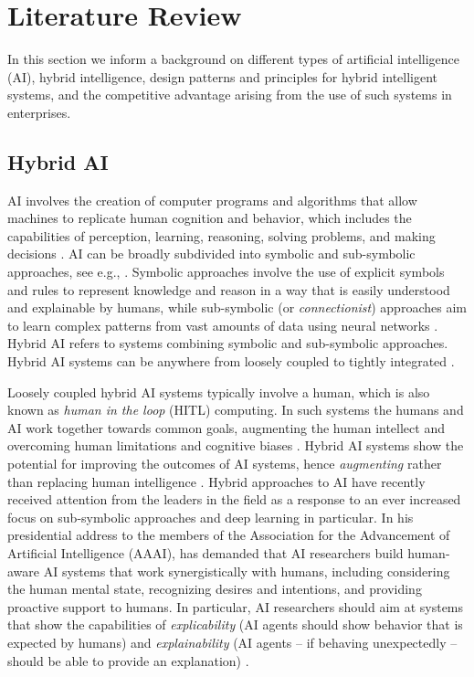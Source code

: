\section{Literature Review}
\label{sec:literature}

In this section we inform a background on different types of artificial intelligence (AI), hybrid intelligence, 
design patterns and principles for hybrid intelligent systems, and the competitive advantage arising from
the use of such systems in enterprises.

\subsection{Hybrid AI}

AI involves the creation of computer programs and algorithms that allow machines to replicate human cognition and behavior,
which includes the capabilities of perception, learning, reasoning, solving problems, and making decisions \citep{russel2010}.
AI can be broadly subdivided into symbolic and sub-symbolic approaches, see e.g., \cite{eliasmithSymbolicSubsymbolic2006}.
Symbolic approaches involve the use of explicit symbols and rules to represent knowledge and reason in a way that is easily
understood and explainable by humans, while sub-symbolic (or \textit{connectionist}) approaches aim to learn complex patterns
from vast amounts of data using neural networks \citep{ilkouSymbolicVsSubsymbolic2020}. Hybrid AI refers to systems combining
symbolic and sub-symbolic approaches. Hybrid AI systems can be anywhere from loosely coupled to tightly integrated
\citep{garcezNeurosymbolicAI3rd2023}.

Loosely coupled hybrid AI systems typically involve a human, which is also known as \textit{human in the loop} (HITL)
computing. In such systems the humans and AI work together towards common goals, augmenting the human intellect and
overcoming human limitations and cognitive biases \citep{akataResearchAgendaHybrid2020}. Hybrid AI systems show the
potential for improving the outcomes of AI systems, hence \textit{augmenting} rather than replacing human intelligence
\citep{akataResearchAgendaHybrid2020}. Hybrid approaches to AI have recently received attention from the leaders in
the field as a response to an ever increased focus on sub-symbolic approaches and deep learning in particular. In his
presidential address to the members of the Association for the Advancement of Artificial Intelligence (AAAI),
\cite{kambhampatiChallengesHumanAwareAI2020} has demanded that AI researchers build human-aware AI systems that work
synergistically with humans, including considering the human mental state, recognizing desires and intentions, and
providing proactive support to humans. In particular, AI researchers should aim at systems that show the capabilities
of \textit{explicability} (AI agents should show behavior that is expected by humans) and \textit{explainability}
(AI agents -- if behaving unexpectedly -- should be able to provide an explanation) \citep{kambhampatiChallengesHumanAwareAI2020}.

